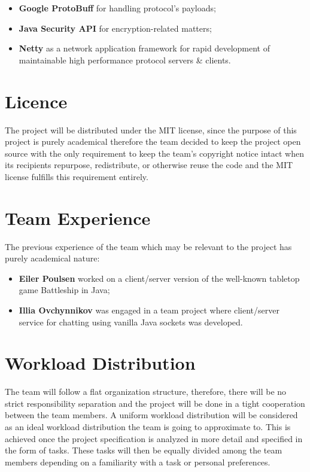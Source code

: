 \documentclass{article}
\begin{document}
\begin{itemize}
\item \textbf{Google ProtoBuff} for handling protocol's payloads;
\item \textbf{Java Security API} for encryption-related matters;
\item \textbf{Netty} as a network application framework for rapid development of maintainable high performance protocol servers \& clients.
\end{itemize}

\section{Licence}
The project will be distributed under the MIT license, since the purpose of this project is purely academical therefore the team decided to keep the project open source with the only requirement to keep the team's copyright notice intact when its recipients repurpose, redistribute, or otherwise reuse the code and the MIT license fulfills this requirement entirely.

\section{Team Experience}
The previous experience of the team which may be relevant to the project has purely academical nature:

\begin{itemize}
\item \textbf{Eiler Poulsen} worked on a client/server version of the well-known tabletop game Battleship in Java;
\item \textbf{Illia Ovchynnikov} was engaged in a team project where client/server service for chatting using vanilla Java sockets was developed.
\end{itemize}

\section{Workload Distribution}
The team will follow a flat organization structure, therefore, there will be no strict responsibility separation and the project will be done in a tight cooperation between the team members. A uniform workload distribution will be considered as an ideal workload distribution the team is going to approximate to. This is achieved once the project specification is analyzed in more detail and specified in the form of tasks. These tasks will then be equally divided among the team members depending on a familiarity with a task or personal preferences.
\end{document}
